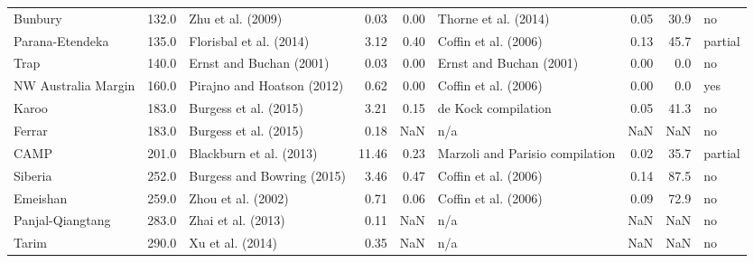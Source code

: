 \begin{tabular}{lrlrrlrrl}
             Bunbury &  132.0 &             Zhu et al. (2009) &                0.03 &               0.00 &                           Thorne et al. (2014) &              0.05 &       30.9 &       no \\
     Parana-Etendeka &  135.0 &       Florisbal et al. (2014) &                3.12 &               0.40 &                           Coffin et al. (2006) &              0.13 &       45.7 &  partial \\
                Trap &  140.0 &       Ernst and Buchan (2001) &                0.03 &               0.00 &                        Ernst and Buchan (2001) &              0.00 &        0.0 &       no \\
 NW Australia Margin &  160.0 &    Pirajno and Hoatson (2012) &                0.62 &               0.00 &                           Coffin et al. (2006) &              0.00 &        0.0 &      yes \\
               Karoo &  183.0 &         Burgess et al. (2015) &                3.21 &               0.15 &                            de Kock compilation &              0.05 &       41.3 &       no \\
              Ferrar &  183.0 &         Burgess et al. (2015) &                0.18 &                NaN &                                            n/a &               NaN &        NaN &       no \\
                CAMP &  201.0 &       Blackburn et al. (2013) &               11.46 &               0.23 &                Marzoli and Parisio compilation &              0.02 &       35.7 &  partial \\
             Siberia &  252.0 &    Burgess and Bowring (2015) &                3.46 &               0.47 &                           Coffin et al. (2006) &              0.14 &       87.5 &       no \\
            Emeishan &  259.0 &            Zhou et al. (2002) &                0.71 &               0.06 &                           Coffin et al. (2006) &              0.09 &       72.9 &       no \\
    Panjal-Qiangtang &  283.0 &            Zhai et al. (2013) &                0.11 &                NaN &                                            n/a &               NaN &        NaN &       no \\
               Tarim &  290.0 &              Xu et al. (2014) &                0.35 &                NaN &                                            n/a &               NaN &        NaN &       no \\

\end{tabular}
